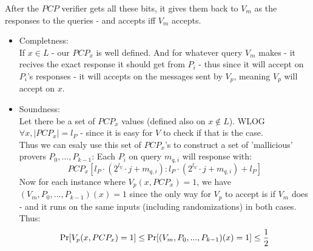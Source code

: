 After the $PCP$ verifier gets all these bits,
it gives them back to $V_m$ as the responses to the queries -
and accepts iff $V_m$ accepts.\\

\begin{itemize}
	\item Completness:\\
	If $x\in L$ - our $PCP_x$ is well defined.
	And for whatever query $V_m$ makes - it recives the exact
	response it should get from $P_i$ - thus since it will accept
	on $P_i$'s responses - it will accepts on the messages sent by $V_p$,
	meaning $V_p$ will accept on $x$.
	\item Soundness:\\
	Let there be a set of $PCP_x$ values (defined also on $x\notin L$).
	WLOG $\forall x,|PCP_x|=l_P$ - since it is easy for $V$ to check if that is the case.\\
	Thus we can esaly use this set of $PCP_x$'s to
	construct a set of 'mallicious' provers $P_0,...,P_{k-1}$:
	Each $P_i$ on query $m_{q,i}$ will response with:
	\[
		PCP_x[l_P\cdot(2^{l_V}\cdot j+m_{q,i}):l_P\cdot(2^{l_V}\cdot j+m_{q,i})+l_P]
	\]
	Now for each instance where $V_p(x,PCP_x)=1$, we have
	$(V_m,P_0,...,P_{k-1})(x)=1$ since the only way for $V_p$
	to accept is if $V_m$ does - and it runs on the same inputs (including randomizations) in both cases.\\
	Thus:
	\[
		\operatorname*{Pr}[V_p(x,PCP_x)=1]\leq \operatorname*{Pr}[(V_m,P_0,...,P_{k-1})(x)=1]\leq\frac{1}{2}
	\] 
\end{itemize}